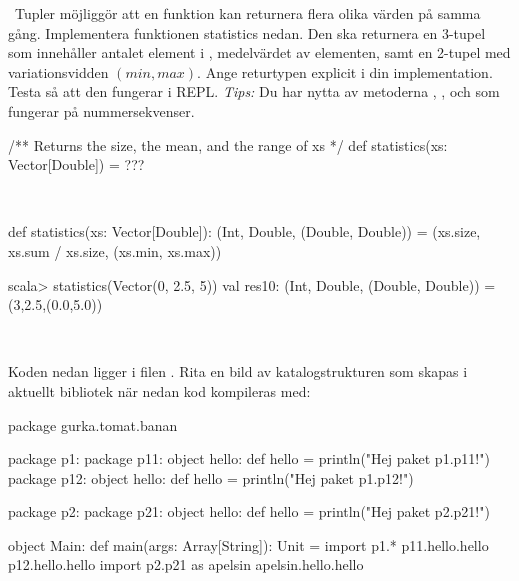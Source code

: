 \QUESTBEGIN

\Task \what~Tupler möjliggör att en funktion kan returnera flera olika värden på samma gång. Implementera funktionen statistics nedan. Den ska returnera en 3-tupel som innehåller antalet element i , medelvärdet av elementen, samt en 2-tupel med variationsvidden $(min, max)$. Ange returtypen explicit i din implementation. Testa så att den fungerar i REPL. \emph{Tips:} Du har nytta av metoderna , ,  och  som fungerar på nummersekvenser.

\begin{Code}
/** Returns the size, the mean, and the range of xs */
def statistics(xs: Vector[Double]) = ???
\end{Code}

\SOLUTION

\TaskSolved \what~

\begin{Code}
def statistics(xs: Vector[Double]): (Int, Double, (Double, Double)) =
  (xs.size, xs.sum / xs.size, (xs.min, xs.max))
\end{Code}

\begin{REPL}
scala> statistics(Vector(0, 2.5, 5))
val res10: (Int, Double, (Double, Double)) = (3,2.5,(0.0,5.0))
\end{REPL}

\QUESTEND





\QUESTBEGIN

\Task \what~

\Subtask Koden nedan ligger i filen . Rita en bild av katalogstrukturen som skapas i aktuellt bibliotek när nedan kod kompileras med: 
\begin{Code}
package gurka.tomat.banan

package p1:
  package p11:
    object hello:
      def hello = println("Hej paket p1.p11!")
  package p12:
    object hello:
      def hello = println("Hej paket p1.p12!")

package p2:
  package p21:
    object hello:
      def hello = println("Hej paket p2.p21!")

object Main:
  def main(args: Array[String]): Unit =
    import p1.*
    p11.hello.hello
    p12.hello.hello
    import p2.{p21 as apelsin}
    apelsin.hello.hello
\end{Code}

